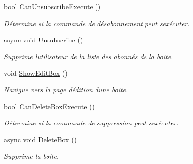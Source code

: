 \begin{DoxyCompactItemize}
bool \hyperlink{class_boxes_1_1_view_models_1_1_box_view_model_a8c04f53828390cd778340ac779038699}{Can\+Unsubscribe\+Execute} ()
\begin{DoxyCompactList}\small\item\em Détermine si la commande de désabonnement peut s\textquotesingle{}exécuter. \end{DoxyCompactList}\item 
async void \hyperlink{class_boxes_1_1_view_models_1_1_box_view_model_a80eff5e9b5d230454b73e6b2925dea8b}{Unsubscribe} ()
\begin{DoxyCompactList}\small\item\em Supprime l\textquotesingle{}utilisateur de la liste des abonnés de la boite. \end{DoxyCompactList}\item 
void \hyperlink{class_boxes_1_1_view_models_1_1_box_view_model_ae4a930c03ccfcec39315bba31831fab9}{Show\+Edit\+Box} ()
\begin{DoxyCompactList}\small\item\em Navigue vers la page d\textquotesingle{}édition d\textquotesingle{}une boite. \end{DoxyCompactList}\item 
bool \hyperlink{class_boxes_1_1_view_models_1_1_box_view_model_a39fd887cb76c4f93d287c2de12dbf3f8}{Can\+Delete\+Box\+Execute} ()
\begin{DoxyCompactList}\small\item\em Détermine si la commande de suppression peut s\textquotesingle{}exécuter. \end{DoxyCompactList}\item 
async void \hyperlink{class_boxes_1_1_view_models_1_1_box_view_model_a14df8064b707b4fb149140d0c36bd6d4}{Delete\+Box} ()
\begin{DoxyCompactList}\small\item\em Supprime la boite. \end{DoxyCompactList}\end{DoxyCompactItemize}
